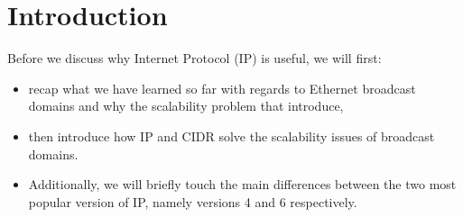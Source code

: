 \documentclass[pdftex,12pt,a4paper]{article}
\begin{document}
    \section{Introduction}
        Before we discuss why Internet Protocol (IP) is useful, we will first:
        \begin{itemize}
            \item recap what we have learned so far with regards to Ethernet
                broadcast domains and why the scalability problem that
                introduce,
            \item then introduce how IP and CIDR solve the scalability issues of
                broadcast domains.
            \item Additionally, we will briefly touch the main differences
                between the two most popular version of IP, namely versions 4
                and 6 respectively.
        \end{itemize}
\end{document}
